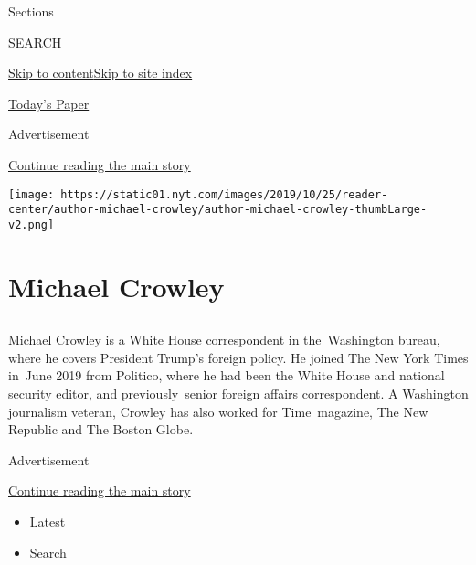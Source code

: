 Sections

SEARCH

\protect\hyperlink{site-content}{Skip to
content}\protect\hyperlink{site-index}{Skip to site index}

\href{https://myaccount.nytimes.com/auth/login?response_type=cookie\&client_id=vi}{}

\href{https://www.nytimes.com/section/todayspaper}{Today's Paper}

Advertisement

\protect\hyperlink{after-top}{Continue reading the main story}

\texttt{[image: https://static01.nyt.com/images/2019/10/25/reader-center/author-michael-crowley/author-michael-crowley-thumbLarge-v2.png]}

\hypertarget{michael-crowley}{%
\section{Michael Crowley}\label{michael-crowley}}

\subsection{}

Michael Crowley is a White House correspondent in the~Washington bureau,
where he covers President Trump's foreign policy. He joined The New York
Times in~June 2019 from Politico, where he had been the White House and
national security editor, and previously~senior foreign affairs
correspondent. A Washington journalism veteran, Crowley has also worked
for Time~magazine, The New Republic and The Boston Globe.

Advertisement

\protect\hyperlink{after-mid1}{Continue reading the main story}

\begin{itemize}
\tightlist
\item
  \protect\hyperlink{stream-panel}{Latest}
\item
  Search
\end{itemize}

